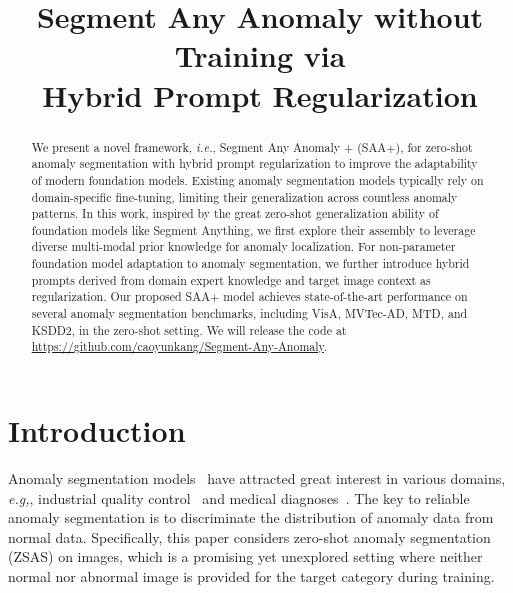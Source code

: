 \title{Segment Any Anomaly without Training via \\  Hybrid Prompt Regularization}



\maketitle

\renewcommand{\thefootnote}{\fnsymbol{footnote}}

\renewcommand{\thefootnote}{\arabic{footnote}}

\begin{abstract}
We present a novel framework, \textit{i.e.}, Segment Any Anomaly + (SAA$+$), for zero-shot anomaly segmentation with hybrid prompt regularization to improve the adaptability of modern foundation models. Existing anomaly segmentation models typically rely on domain-specific fine-tuning, limiting their generalization across countless anomaly patterns. In this work, inspired by the great zero-shot generalization ability of foundation models like Segment Anything, we first explore their assembly to leverage diverse multi-modal prior knowledge for anomaly localization. For non-parameter foundation model adaptation to anomaly segmentation, we further introduce hybrid prompts derived from domain expert knowledge and target image context as regularization. Our proposed SAA$+$ model achieves state-of-the-art performance on several anomaly segmentation benchmarks, including VisA, MVTec-AD, MTD, and KSDD2, in the zero-shot setting. We will release the code at \href{https://github.com/caoyunkang/Segment-Any-Anomaly}{https://github.com/caoyunkang/Segment-Any-Anomaly}.

\end{abstract}

\section{Introduction}
\label{sec:intro}
 Anomaly segmentation models~\cite{cao_collaborative_2023, wan_industrial_2022, roth2022towards} have attracted great interest in various domains, \textit{e.g,}, industrial quality control~\cite{bergmann2019mvtec, bergmann2020uninformed} and medical diagnoses~\cite{baur_autoencoders_2021}. The key to reliable anomaly segmentation is to discriminate the distribution of anomaly data from normal data. Specifically, this paper considers zero-shot anomaly segmentation (ZSAS) on images, which is a promising yet unexplored setting where neither normal nor abnormal image is provided for the target category during  training.

